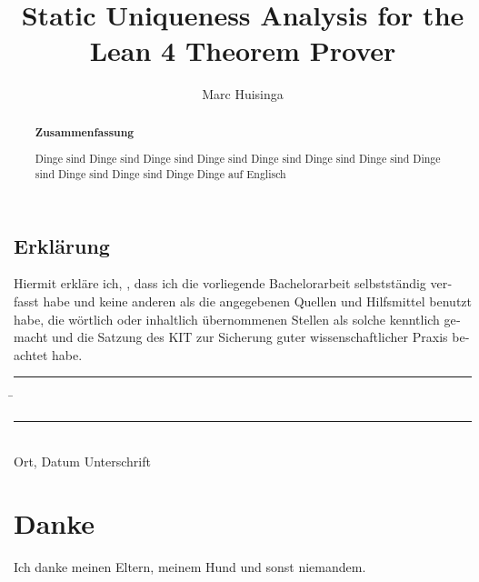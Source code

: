 \documentclass[parskip=full,12pt,a4paper,twoside,headings=openright, fleqn]{scrreprt}
\title{Static Uniqueness Analysis for the Lean 4 Theorem Prover}
\author{Marc Huisinga}
\begin{document}
\begin{otherlanguage}{ngerman} %
\mytitlepage
\end{otherlanguage}

\begin{abstract}
\begin{center}\Huge\textbf{\textsf{Zusammenfassung}}
\end{center}
\vfill

Dinge sind Dinge sind Dinge sind Dinge sind Dinge sind Dinge sind Dinge sind Dinge sind Dinge sind Dinge sind Dinge
\vfill
Dinge auf Englisch
\vfill
\end{abstract}

\tableofcontents














\begin{otherlanguage}{ngerman}
\chapter*{Erklärung}
\pagestyle{empty}

  \vspace{20mm}
  Hiermit erkläre ich, \theauthor, dass ich die vorliegende Bachelorarbeit selbst\-ständig
verfasst habe und keine anderen als die angegebenen Quellen und Hilfsmittel
benutzt habe, die wörtlich oder inhaltlich übernommenen Stellen als solche kenntlich gemacht und
die Satzung des KIT zur Sicherung guter wissenschaftlicher Praxis beachtet habe.
  \vspace{20mm}
  \begin{tabbing}
  \rule{7cm}{.4pt}\hspace{1cm} \= \rule{6.8cm}{.4pt} \\
 Ort, Datum \> Unterschrift
  \end{tabbing}
\end{otherlanguage}

\chapter*{Danke}
\pagestyle{empty}

Ich danke meinen Eltern, meinem Hund und sonst niemandem.

\pagestyle{fancy}
\appendix


\end{document}
